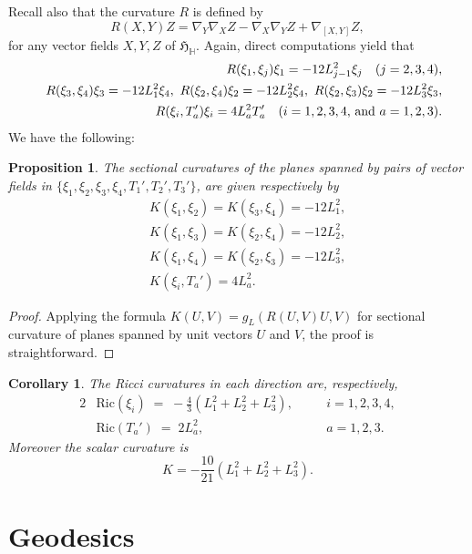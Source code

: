 \documentclass [12pt,a4paper]{amsart}
\newcommand{\mH}{\mathbb{H}}
\newcommand{\frakH}{\mathfrak{H}}
\theoremstyle{plain}
\newtheorem{cor}[thm]{Corollary}
\newtheorem{prop}[thm]{Proposition}
\theoremstyle{definition}
\numberwithin{equation}{section}
\begin{document}
Recall also that the curvature $R$  is defined by
\begin{equation}
R(X, Y) Z=\nabla_Y\nabla_X Z-\nabla_X\nabla_Y Z+\nabla_{[X,Y]} Z,
\end{equation}
for any vector fields $X,Y,Z$ of $\frakH_{\mH}$.
Again, direct computations yield that 
\begin{eqnarray*}
&& R(\xi_1, \xi_j)\xi_1=-12L_{j-1}^2\xi_j \quad (j=2, 3, 4),\\
&&R(\xi_3, \xi_4)\xi_3=-12L_1^2\xi_4,\,\, R(\xi_2, \xi_4)\xi_2=-12L_2^2\xi_4,\,\,  R(\xi_2, \xi_3)\xi_2=-12L_3^2\xi_3,  \\
&& R(\xi_i, T_a')\xi_i=4L_a^2 T_a' \quad (i=1, 2, 3, 4, \,{\rm and}\,\, a=1, 2, 3).
\end{eqnarray*}
We have the following:
\begin{prop}
The sectional curvatures of the planes spanned by pairs of vector fields in $\{\xi_1,\xi_2,\xi_3,\xi_4, T_1', T_2', T_3'\}$, are given respectively by
\begin{eqnarray*}
&& K(\xi_1, \xi_2)=K(\xi_3, \xi_4)=-12L_1^2,\\
&& K(\xi_1, \xi_3)=K(\xi_2, \xi_4)=-12L_2^2,\\
&& K(\xi_1, \xi_4)=K(\xi_2, \xi_3)=-12L_3^2,\\
&& K(\xi_i, T_a')=4L_a^2.
\end{eqnarray*}
\end{prop}
\begin{proof}
Applying the formula $K(U, V)=g_L(R(U, V)U, V)$ for sectional curvature of planes spanned by unit vectors $U$ and $V$, the proof is straightforward. 
\end{proof}
\begin{cor}
The Ricci curvatures in each direction are, respectively,
\begin{alignat*}{2}
&\mathrm{Ric}(\xi_i) \; =\; -\frac{4}{3}(L_1^2 + L_2^2 + L_3^2), \quad && i = 1, 2, 3, 4, \\
&\mathrm{Ric}(T_a') \;   =\; 2L_a^2,              \quad && a = 1, 2, 3.
\end{alignat*}
Moreover the scalar curvature is
$$K
=-\frac{10}{21}(L_1^2+L_2^2+L_3^2).$$
\end{cor}


\section{Geodesics}\label{sec:geo}
\end{document}
